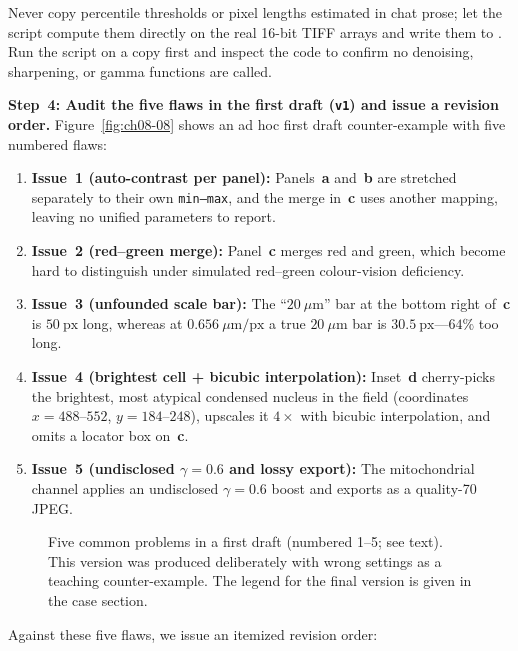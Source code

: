 Never copy percentile thresholds or pixel lengths estimated in chat prose; let the script compute them directly on the real 16-bit TIFF arrays and write them to . Run the script on a copy first and inspect the code to confirm no denoising, sharpening, or gamma functions are called.

\textbf{Step~4: Audit the five flaws in the first draft (\texttt{v1}) and issue a revision order.} Figure~\ref{fig:ch08-08} shows an ad hoc first draft counter-example with five numbered flaws:
\begin{enumerate}
\item \textbf{Issue~1 (auto-contrast per panel):} Panels~\textbf{a} and~\textbf{b} are stretched separately to their own \texttt{min--max}, and the merge in~\textbf{c} uses another mapping, leaving no unified parameters to report.
\item \textbf{Issue~2 (red--green merge):} Panel~\textbf{c} merges red and green, which become hard to distinguish under simulated red--green colour-vision deficiency.
\item \textbf{Issue~3 (unfounded scale bar):} The ``$20\ \mu\text{m}$'' bar at the bottom right of~\textbf{c} is $50\ \text{px}$ long, whereas at $0.656\ \mu\text{m/px}$ a true $20\ \mu\text{m}$ bar is $30.5\ \text{px}$---$64\%$ too long.
\item \textbf{Issue~4 (brightest cell + bicubic interpolation):} Inset~\textbf{d} cherry-picks the brightest, most atypical condensed nucleus in the field (coordinates $x = 488\text{--}552$, $y = 184\text{--}248$), upscales it $4\times$ with bicubic interpolation, and omits a locator box on~\textbf{c}.
\item \textbf{Issue~5 (undisclosed $\gamma = 0.6$ and lossy export):} The mitochondrial channel applies an undisclosed $\gamma = 0.6$ boost and exports as a quality-70 JPEG.
\end{enumerate}

\begin{figure}[htbp]\centering
\resizebox{0.88\linewidth}{!}{}
\caption{Five common problems in a first draft (numbered 1--5; see text). This version was produced deliberately with wrong settings as a teaching counter-example. The legend for the final version is given in the case section.}\label{fig:ch08-08}\label{fig:ch08-08-v1}
\end{figure}

Against these five flaws, we issue an itemized revision order:

